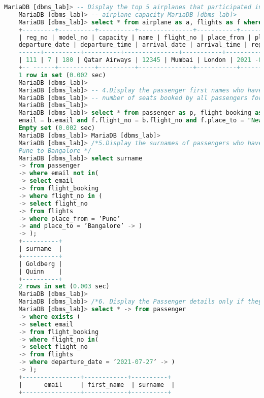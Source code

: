 \documentclass{article}
\begin{document}
\begin{lstlisting}[language=SQL]
    MariaDB [dbms_lab]> -- Display the top 5 airplanes that participated in Flights from Mumbai to London based on the
    MariaDB [dbms_lab]> -- airplane capacity MariaDB [dbms_lab]>
    MariaDB [dbms_lab]> select * from airplane as a, flights as f where a.reg_no = f.reg_no and f .place_from = "Mumbai" and f.place_to = "London" order by a.capacity desc limit 5;
    +---------+----------+----------+---------------+-----------+------------+----------+-----------
    | reg_no | model_no | capacity | name | flight_no | place_from | place_to |
    departure_date | departure_time | arrival_date | arrival_time | reg_no | +--
    ------+----------+----------+---------------+-----------+------------+----------+-----------
    | 111 | 7 | 180 | Qatar Airways | 12345 | Mumbai | London | 2021 -07 -27 | 12:12:12 | 2021 -07 -28 | 23:59:56 | 111 |
    +-- ------+----------+----------+---------------+-----------+------------+----------+-----------
    1 row in set (0.002 sec)
    MariaDB [dbms_lab]>
    MariaDB [dbms_lab]> -- 4.Display the passenger first names who have booked the no_of seats smaller than the average
    MariaDB [dbms_lab]> -- number of seats booked by all passengers for the arrival airport:New Delhi
    MariaDB [dbms_lab]>
    MariaDB [dbms_lab]> select * from passenger as p, flight_booking as b, flights as f where p.
    email = b.email and f.flight_no = b.flight_no and f.place_to = "New Delhi" and b.no_seats < all(select avg(no_seats) from flight_booking);
    Empty set (0.002 sec)
    MariaDB [dbms_lab]> MariaDB [dbms_lab]>
    MariaDB [dbms_lab]> /*5.Display the surnames of passengers who have not booked a flight from
    Pune to Bangalore */
    MariaDB [dbms_lab]> select surname
    -> from passenger
    -> where email not in(
    -> select email
    -> from flight_booking
    -> where flight_no in (
    -> select flight_no
    -> from flights
    -> where place_from = ’Pune’
    -> and place_to = ’Bangalore’ -> )
    -> ); 
    +----------+
    | surname  | 
    +----------+
    | Goldberg | 
    | Quinn    |
    +----------+
    2 rows in set (0.003 sec)
    MariaDB [dbms_lab]>
    MariaDB [dbms_lab]> /*6. Display the Passenger details only if they have booked flights on 21 st July 2021. (Use Exists)*/
    MariaDB [dbms_lab]> select * -> from passenger
    -> where exists (
    -> select email
    -> from flight_booking
    -> where flight_no in(
    -> select flight_no
    -> from flights
    -> where departure_date = ’2021-07-27’ -> )
    -> );
    +----------------+------------+----------+ 
    |      email     | first_name  | surname  |
    +----------------+------------+----------+ 

\end{lstlisting}
\end{document}

